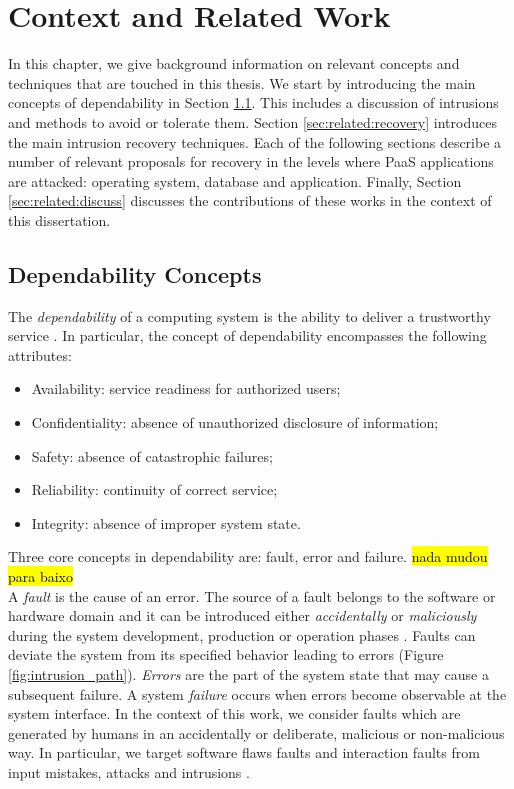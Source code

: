 \chapter{Context and Related Work}
\label{chapter:related_work}
In this chapter, we give background information on relevant concepts and techniques that are touched in this thesis. We start by introducing the main concepts of dependability in Section \ref{sec:related:dependability_concepts}. This includes a discussion of intrusions and methods to avoid or tolerate them. Section \ref{sec:related:recovery} introduces the main intrusion recovery techniques. Each of the following sections describe a number of relevant proposals for recovery in the levels where \ac{PaaS} applications are attacked: operating system, database and application. Finally, Section \ref{sec:related:discuss} discusses the contributions of these works in the context of this dissertation.

\section{Dependability Concepts}
\label{sec:related:dependability_concepts}
The \emph{dependability} of a computing system is the ability to deliver a trustworthy service \cite{Aviz}. In particular, the concept of dependability encompasses the following attributes: 
\begin{itemize}
\item Availability: service readiness for authorized users; 
\item Confidentiality: absence of unauthorized disclosure of information; 
\item Safety: absence of catastrophic failures; 
\item Reliability: continuity of correct service; 
\item Integrity: absence of improper system state.
\end{itemize}
\bigskip

Three core concepts in dependability are: fault, error and failure. \hl{nada mudou para baixo}\\
A \emph{fault} is the cause of an error. The source of a fault belongs to the software or hardware domain and it can be introduced either \emph{accidentally} or \emph{maliciously} during the system development, production or operation phases \cite{Landwehr1992,Aviz}. Faults can deviate the system from its specified behavior leading to errors (Figure \ref{fig:intrusion_path}). \emph{Errors} are the part of the system state that may cause a subsequent failure. A system \emph{failure} occurs when errors become observable at the system interface. In the context of this work, we consider faults which are generated by humans in an accidentally or deliberate, malicious or non-malicious way. In particular, we target software flaws faults and interaction faults from input mistakes, attacks and intrusions \cite{Aviz}. \\  

